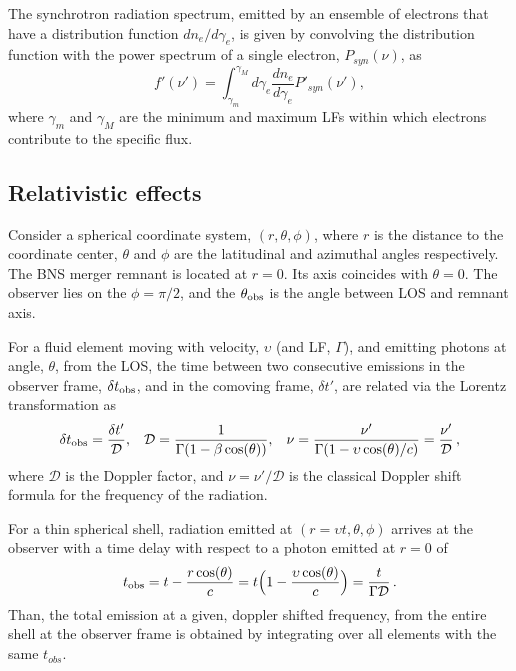 The synchrotron radiation spectrum, emitted by an ensemble of electrons that have a 
distribution function $dn_e/d\gamma_e$, 
is given by convolving the distribution function with the power spectrum of a single 
electron, $P_{syn}(\nu)$, as 
%
\begin{equation}
f'(\nu') = \int_{\gamma_{m}}^{\gamma_M} d\gamma_e \frac{dn_e}{d\gamma_e}P'_{syn}(\nu'), 
\label{eq:afterglow:sync_power}
\end{equation}
%
where $\gamma_{m}$ and $\gamma_M$ are the minimum and maximum \acp{LF} 
within which electrons contribute to the specific flux.


\subsection{Relativistic effects}

Consider a spherical coordinate system, $(r,\theta,\phi)$, where 
$r$ is the distance to the coordinate center, $\theta$ and $\phi$ 
are the latitudinal and azimuthal angles respectively. 
The \ac{BNS} merger remnant is located at $r=0$. 
Its axis coincides with $\theta = 0$. 
The observer lies on the $\phi = \pi / 2$, and the $\theta_{\rm obs}$ is 
the angle between \ac{LOS} and remnant axis. 

For a fluid element moving with velocity, $\upsilon$ (and \ac{LF}, $\Gamma$), 
and emitting photons at angle, $\theta$, from the \ac{LOS}, the time between 
two consecutive emissions in the observer frame, $\delta t_{\rm obs}$, 
and in the comoving frame, $\delta t'$, are related via the Lorentz transformation as 
%
\begin{equation}
\delta t_{\rm obs} = \frac{\delta t'}{\mathcal{D}}, \hspace{3mm}
\mathcal{D} = \frac{1}{\Gamma(1 - \beta\cos(\theta))}, \hspace{3mm}
\nu = \frac{\nu'}{\Gamma (1 - \upsilon\cos(\theta)/c)} = \frac{\nu'} {\mathcal{D}}\, ,
\label{eq:afterglow:dop_fac}
\end{equation}
%
where $\mathcal{D}$ is the Doppler factor, and $\nu=\nu'/\mathcal{D}$ is the 
classical Doppler shift formula for the frequency of the radiation.


For a thin spherical shell, radiation emitted at $(r=\upsilon t,\theta,\phi)$ 
arrives at the observer with a time delay with respect to a photon emitted at 
$r=0$ of
%
\begin{equation}
t_{\rm obs} = t - \frac{r \cos(\theta)}{c} = t\Big(1-\frac{\upsilon\cos(\theta)}{c}\Big) = \frac{t}{\Gamma\mathcal{D}}\, .
\label{eq:afterglow:tobs}
\end{equation}
%
Than, the total emission at a given, doppler shifted frequency, from the entire 
shell at the observer frame is obtained by integrating over all elements with the 
same $t_{obs}$.

